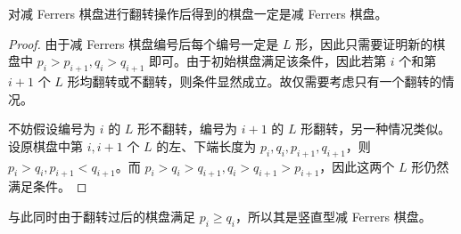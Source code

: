 \documentclass{noithesis}
\begin{document}
	\begin{theorem}
		对减 Ferrers 棋盘进行翻转操作后得到的棋盘一定是减 Ferrers 棋盘。
	\end{theorem}
	\begin{proof}
		由于减 Ferrers 棋盘编号后每个编号一定是 $L$ 形，因此只需要证明新的棋盘中 $p_i > p_{i+1},q_i > q_{i+1}$ 即可。由于初始棋盘满足该条件，因此若第 $i$ 个和第 $i+1$ 个 $L$ 形均翻转或不翻转，则条件显然成立。故仅需要考虑只有一个翻转的情况。
		
		不妨假设编号为 $i$ 的 $L$ 形不翻转，编号为 $i+1$ 的 $L$ 形翻转，另一种情况类似。设原棋盘中第 $i,i+1$ 个 $L$ 的左、下端长度为 $p_i,q_i,p_{i+1},q_{i+1}$，则 $p_i>q_i,p_{i+1}<q_{i+1}$。而 $p_i>q_i>q_{i+1},q_i>q_{i+1}>p_{i+1}$，因此这两个 $L$ 形仍然满足条件。
	\end{proof}
	
	与此同时由于翻转过后的棋盘满足 $p_i \geq q_i$，所以其是竖直型减 Ferrers 棋盘。
	
\end{document}
